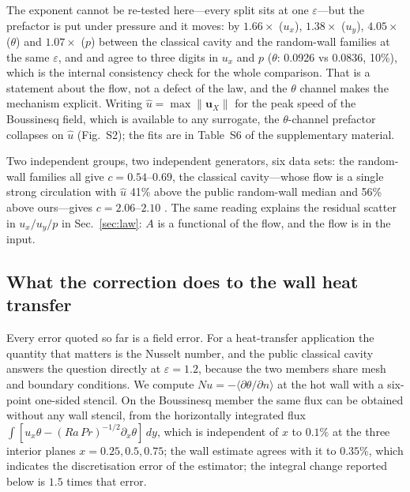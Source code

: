 \documentclass[preprint,11pt,a4paper,times,doubleblind]{elsarticle}
\begin{document}
The exponent cannot be re-tested here---every split sits at one $\varepsilon$---but the prefactor is
put under pressure and it moves: by $1.66\times$ ($u_x$), $1.38\times$ ($u_y$), $4.05\times$
($\theta$) and $1.07\times$ ($p$) between the classical cavity and the random-wall families at the
same $\varepsilon$, and  and  agree to three digits in
$u_x$ and $p$ ($\theta$: 0.0926 vs 0.0836, 10\%), which is the internal consistency check for the
whole comparison. That is a statement about the flow, not a defect of the law, and the $\theta$
channel makes the mechanism explicit. Writing $\hat u=\max\|\bm u_X\|$ for the peak speed of the Boussinesq field, which is available to
any surrogate, the $\theta$-channel prefactor collapses on $\hat u$ (Fig.~S2); the
fits are in Table~S6 of the supplementary material.




Two independent groups, two independent generators, six data sets: the random-wall families all give
$c=0.54$--$0.69$, the classical cavity---whose flow is a single strong circulation with $\hat u$
41\% above the public random-wall median and 56\% above ours---gives $c=2.06$--$2.10$
. The same reading explains the residual scatter in $u_x/u_y/p$ in
Sec.~\ref{sec:law}: $A$ is a functional of the flow, and the flow is in the input.
\subsection{What the correction does to the wall heat transfer}
\label{sec:nu}

Every error quoted so far is a field error. For a heat-transfer application the quantity that
matters is the Nusselt number, and the public classical cavity answers the question directly at
$\varepsilon=1.2$, because the two members share mesh and boundary conditions. We compute
$Nu=-\langle\partial\theta/\partial n\rangle$ at the hot wall with a six-point one-sided stencil.
On the Boussinesq member the same flux can be obtained without any wall stencil, from the
horizontally integrated flux $\int[u_x\theta-(Ra\,Pr)^{-1/2}\partial_x\theta]\,dy$, which is
independent of $x$ to $0.1\%$ at the three interior planes $x=0.25,0.5,0.75$; the wall estimate
agrees with it to $0.35\%$, which indicates the discretisation error of the estimator; the integral
change reported below is $1.5$ times that error.
\end{document}
